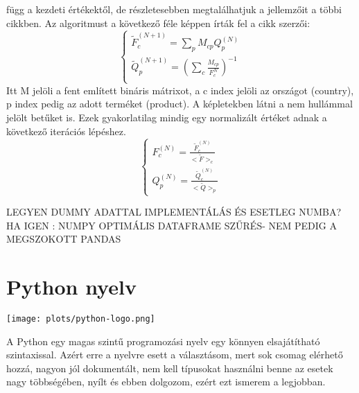 \documentclass{article}
\theoremstyle{definition}
\theoremstyle{theorem}
\begin{document}
függ a kezdeti értékektől, de részletesebben megtalálhatjuk a jellemzőit a többi cikkben. Az algoritmust a következő féle képpen írták fel a cikk szerzői:
\begin{equation*}
    \begin{cases}
    \widetilde{F}_{c}^{(N + 1)} = \sum_{p} M_{cp} Q_{p}^{(N)} \\
    \widetilde{Q}_{p}^{(N+1)} = (\sum_{c} \frac{M_{cp}}{F_c^N})^{-1} \\

    \end{cases}
\end{equation*}
Itt M jelöli a fent említett bináris mátrixot, a c index jelöli az országot (country), p index pedig az adott terméket (product). A képletekben látni a nem hullámmal jelölt betűket is. Ezek gyakorlatilag mindig egy normalizált értéket adnak a következő iterációs lépéshez.
\begin{equation*}
    \begin{cases}
    F_c^{(N)} = \frac{\widetilde{F}_{c}^{(N)}}{<\widetilde{F}>_c} \\
    Q_p^{(N)} = \frac{\widetilde{Q}_{c}^{(N)}}{<\widetilde{Q}>_p}
    \end{cases}
\end{equation*}

\begin{center}
    LEGYEN DUMMY ADATTAL IMPLEMENTÁLÁS ÉS ESETLEG NUMBA? HA IGEN : NUMPY OPTIMÁLIS DATAFRAME SZŰRÉS- NEM PEDIG A MEGSZOKOTT PANDAS
\end{center}
\pagebreak
\section{Python nyelv}
\begin{center}
    \texttt{[image: plots/python-logo.png]}
\end{center}

A Python egy magas szintű programozási nyelv egy könnyen elsajátítható szintaxissal. Azért erre a nyelvre esett
a választásom, mert sok csomag elérhető hozzá, nagyon jól dokumentált, nem kell típusokat használni benne az
esetek nagy többségében, nyílt és ebben dolgozom, ezért ezt ismerem a legjobban.
\end{document}
